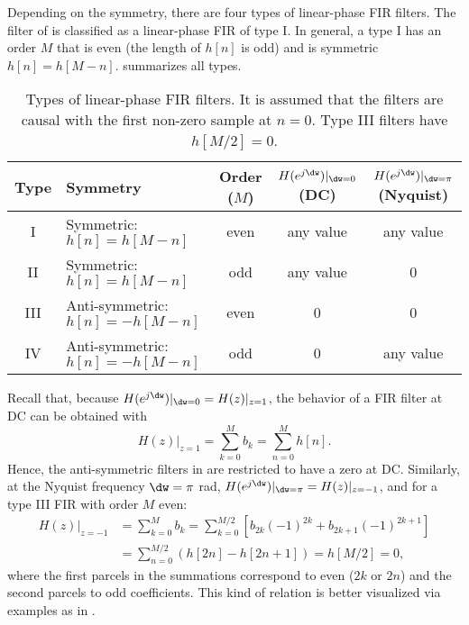 Depending on the symmetry, there are four types of linear-phase FIR filters.
The filter of  is classified as a linear-phase FIR of type I.
In general, a type I has an order $M$ that is even (the length of $h[n]$ is odd) and is symmetric $h[n]=h[M-n]$.  summarizes all types.

\begin{table}
\centering
\caption[Types of linear-phase FIR filters]{Types of linear-phase FIR filters. It is assumed that the filters are causal with the first non-zero sample at $n=0$. Type III filters have $h[M/2]=0$.\label{tab:fir-types}}
\begin{tabularx}{\textwidth}{c>{\centering}p{2.8cm}CCC}
\toprule
Type & Symmetry & Order ($M$) & $H(e^{j\dw})|_{\dw=0}$ (DC) & $H(e^{j\dw})|_{\dw=\pi}$ (Nyquist) \\
\midrule
I & Symmetric: $h[n]=h[M-n]$ & even & any value & any value\\
II & Symmetric: $h[n]=h[M-n]$ & odd & any value & 0\\
III & Anti-symmetric: $h[n]=-h[M-n]$ & even & 0 & 0\\
IV & Anti-symmetric: $h[n]=-h[M-n]$ & odd & 0 & any value\\
\bottomrule
\end{tabularx}
\end{table}

Recall that, because $H(e^{j\dw})|_{\dw=0} = H(z)|_{z=1}$, the behavior of a FIR filter at DC can be obtained with 
\[
H(z)|_{z=1}= \sum_{k=0}^M b_k = \sum_{n=0}^M h[n].
\]
Hence, the anti-symmetric filters in  are restricted to have a zero at DC.
Similarly, at the Nyquist frequency $\dw=\pi$ rad, $H(e^{j\dw})|_{\dw=\pi} = H(z)|_{z=-1}$, and for a type III FIR with order $M$ even:
\begin{align*}
H(z)|_{z=-1}&= \sum_{k=0}^M b_k = \sum_{k=0}^{M/2} [b_{2k} (-1)^{2k} + b_{2k+1} (-1)^{2k+1}]\\
&= \sum_{n=0}^{M/2} (h[2n] - h[2n+1]) = h[M/2]=0,
\end{align*}
where the first parcels in the summations correspond to even ($2k$ or $2n$) and the second parcels to odd coefficients.
This kind of relation is better visualized via examples as in . 

